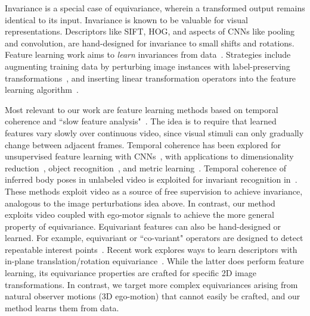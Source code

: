 \documentclass[10pt,twocolumn,letterpaper]{article}
\begin{document}
Invariance is a special case of equivariance, wherein a transformed output remains identical to its input.  Invariance is known to be valuable for visual representations.  Descriptors like SIFT, HOG, and aspects of CNNs like pooling and convolution, are hand-designed for invariance to small shifts and rotations.  Feature learning work aims to \emph{learn} invariances from data~\cite{Simard1998,simard2003best,vincent2008extracting,sohn2012learning,Dosovitskiy2014}.  Strategies include augmenting training data by perturbing image instances with label-preserving transformations~\cite{simard2003best,vincent2008extracting,Dosovitskiy2014}, and inserting linear transformation operators into the feature learning algorithm~\cite{sohn2012learning}.


Most relevant to our work are feature learning methods based on temporal coherence and ``slow feature analysis"~\cite{Wiskott2002,drlim,Mobahi2009}.  The idea is to require that learned features vary slowly over continuous video, since
visual stimuli can only gradually change between adjacent frames.  Temporal coherence has been explored for unsupervised feature learning with CNNs~\cite{Mobahi2009,zou2012deep,Goroshin2014,cadieu2012learning,lies2014slowness}, with applications to dimensionality reduction~\cite{drlim}, object  recognition~\cite{Mobahi2009,zou2012deep}, and metric learning~\cite{Goroshin2014}. Temporal coherence of inferred body poses in unlabeled video is exploited for invariant recognition in~\cite{chaoyeh}.
These methods exploit video as a source of free supervision to achieve invariance, analogous to the image perturbations idea above.  In contrast, our method exploits video coupled with ego-motor signals to achieve the more general property of equivariance.  %
Equivariant features can also be hand-designed or learned.  For example, equivariant or ``co-variant" operators are designed to detect repeatable interest points~\cite{tinne-survey}.  Recent work explores ways to learn descriptors with in-plane translation/rotation equivariance~\cite{kivinen2011transformation,schmidt2012learning}.  While the latter does perform feature learning, its equivariance properties are crafted for specific 2D image transformations.  In contrast, we target more complex equivariances arising from natural observer motions (3D ego-motion) that cannot easily be crafted, and our method learns them from data.
\end{document}
